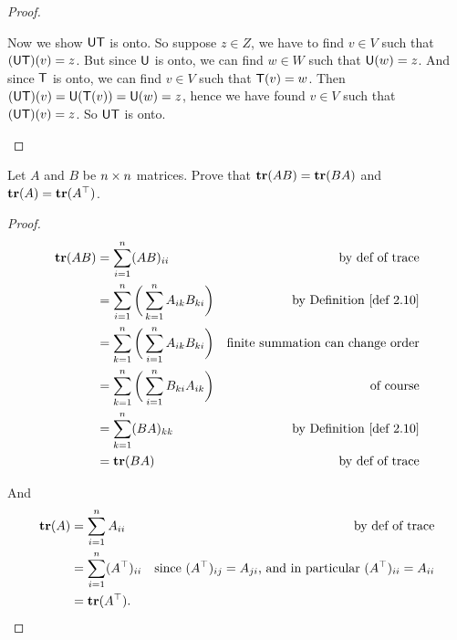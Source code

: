 \begin{proof}
\begin{enumerate}
Now we show \(\textsf{U}\textsf{T}\) is onto.
So suppose \(z \in Z\), we have to find \(v \in V\) such that \((\textsf{U}\textsf{T})(v) = z\).
But since \(\textsf{U}\) is onto, we can find \(w \in W\) such that \(\textsf{U}(w) = z\).
And since \(\textsf{T}\) is onto, we can find \(v \in V\) such that \(\textsf{T}(v) = w\).
Then \((\textsf{U}\textsf{T})(v) = \textsf{U}(\textsf{T}(v)) = \textsf{U}(w) = z\),
hence we have found \(v \in V\) such that \((\textsf{U}\textsf{T})(v) = z\).
So \(\textsf{U}\textsf{T}\) is onto.
\end{enumerate}
\end{proof}

\begin{exercise} \label{exercise 2.3.13}
Let \(A\) and \(B\) be \(n \times n\) matrices.
Prove that \(\textbf{tr}(AB) = \textbf{tr}(BA)\) and \(\textbf{tr}(A) = \textbf{tr}(A^\top)\).
\end{exercise}

\begin{proof}
\begin{align*}
    \TRACE(AB) & = \sum_{i = 1}^n (AB)_{ii} & \text{by def of trace} \\
               & = \sum_{i = 1}^n \bigg( \sum_{k = 1}^n A_{ik} B_{ki} \bigg) & \text{by \DEF{2.10}} \\
               & = \sum_{k = 1}^n \bigg( \sum_{i = 1}^n A_{ik} B_{ki} \bigg) & \text{finite summation can change order} \\
               & = \sum_{k = 1}^n \bigg( \sum_{i = 1}^n B_{ki} A_{ik} \bigg) & \text{of course} \\
               & = \sum_{k = 1}^n (BA)_{kk} & \text{by \DEF{2.10}} \\
               & = \TRACE(BA) & \text{by def of trace}
\end{align*}

And
\begin{align*}
    \textbf{tr}(A) & = \sum_{i = 1}^n A_{ii} & \text{by def of trace} \\
              & = \sum_{i = 1}^n (A^\top)_{ii} & \text{since \((A^\top)_{ij} = A_{ji}\), and in particular \((A^\top)_{ii} = A_{ii}\)} \\
              & = \textbf{tr}(A^\top).
\end{align*}
\end{proof}

